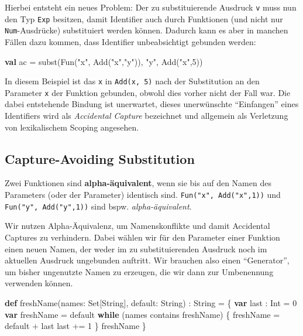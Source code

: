 \documentclass[]{article}
\newenvironment{Shaded}{}{}
\newcommand{\DecValTok}[1]{\textcolor[rgb]{0.25,0.63,0.44}{#1}}
\newcommand{\FunctionTok}[1]{\textcolor[rgb]{0.02,0.16,0.49}{#1}}
\newcommand{\KeywordTok}[1]{\textcolor[rgb]{0.00,0.44,0.13}{\textbf{#1}}}
\newcommand{\NormalTok}[1]{#1}
\newcommand{\StringTok}[1]{\textcolor[rgb]{0.25,0.44,0.63}{#1}}
\begin{document}
Hierbei entsteht ein neues Problem: Der zu substituierende Ausdruck
\texttt{v} muss nun den Typ \texttt{Exp} besitzen, damit Identifier auch
durch Funktionen (und nicht nur \texttt{Num}-Ausdrücke) substituiert
werden können. Dadurch kann es aber in manchen Fällen dazu kommen, dass
Identifier unbeabsichtigt gebunden werden:

\begin{Shaded}
\begin{Highlighting}[]
\KeywordTok{val}\NormalTok{ ac = }\FunctionTok{subst}\NormalTok{(}\FunctionTok{Fun}\NormalTok{(}\StringTok{"x"}\NormalTok{, }\FunctionTok{Add}\NormalTok{(}\StringTok{"x"}\NormalTok{,}\StringTok{"y"}\NormalTok{)), }\StringTok{"y"}\NormalTok{, }\FunctionTok{Add}\NormalTok{(}\StringTok{"x"}\NormalTok{,}\DecValTok{5}\NormalTok{))}
\end{Highlighting}
\end{Shaded}

In diesem Beispiel ist das \texttt{x} in \texttt{Add(x,\ 5)} nach der
Substitution an den Parameter \texttt{x} der Funktion gebunden, obwohl
dies vorher nicht der Fall war. Die dabei entstehende Bindung ist
unerwartet, dieses unerwünschte ``Einfangen'' eines Identifiers wird als
\emph{Accidental Capture} bezeichnet und allgemein als Verletzung von
lexikalischem Scoping angesehen.

\hypertarget{capture-avoiding-substitution}{%
\subsection{Capture-Avoiding
Substitution}\label{capture-avoiding-substitution}}

Zwei Funktionen sind \textbf{alpha-äquivalent}, wenn sie bis auf den
Namen des Parameters (oder der Parameter) identisch sind.
\texttt{Fun("x",\ Add("x",1))} und \texttt{Fun("y",\ Add("y",1))} sind
bspw. \emph{alpha-äquivalent}.

Wir nutzen Alpha-Äquivalenz, um Namenskonflikte und damit Accidental
Captures zu verhindern. Dabei wählen wir für den Parameter einer
Funktion einen neuen Namen, der weder im zu substituierenden Ausdruck
noch im aktuellen Ausdruck ungebunden auftritt. Wir brauchen also einen
``Generator'', um bisher ungenutzte Namen zu erzeugen, die wir dann zur
Umbenennung verwenden können.

\begin{Shaded}
\begin{Highlighting}[]
\KeywordTok{def} \FunctionTok{freshName}\NormalTok{(names: Set[String], default: String) : String = \{}
  \KeywordTok{var}\NormalTok{ last : Int = }\DecValTok{0}
  \KeywordTok{var}\NormalTok{ freshName = default}
  \KeywordTok{while}\NormalTok{ (names contains freshName) \{}
\NormalTok{    freshName = default + last}
\NormalTok{    last += }\DecValTok{1}
\NormalTok{  \}}
\NormalTok{  freshName}
\NormalTok{\}}
\end{Highlighting}
\end{Shaded}
\end{document}
